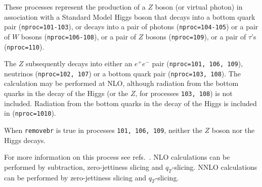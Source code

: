 \label{subsec:zh}

These processes represent the production of a $Z$ boson (or virtual photon)
in association with a Standard Model Higgs boson that
decays into a bottom quark pair ({\tt nproc=101-103}),
or decays into a pair of photons ({\tt nproc=104-105})
or a pair of $W$ bosons ({\tt nproc=106-108}),
or a pair of $Z$ bosons ({\tt nproc=109}),
or a pair of $\tau$'s ({\tt nproc=110}).

The $Z$ subsequently decays into
either an $e^+ e^-$ pair ({\tt nproc=101, 106, 109}), neutrinos ({\tt nproc=102, 107})
or a bottom quark pair ({\tt nproc=103, 108}).
The calculation may be performed at NLO, although radiation from the
bottom quarks in the decay of the Higgs (or the $Z$, for processes
{\tt 103, 108}) is not included.
Radiation from the bottom quarks in the decay of the Higgs is included in ({\tt nproc=1010}).

When {\tt removebr} is true in processes {\tt 101, 106, 109}, neither the $Z$ boson
nor the Higgs decays.

For more information on this
process see refs.~\cite{Campbell:2016jau,Boughezal:2016wmq,Campbell:2022gdq}.
NLO calculations can be performed by subtraction, zero-jettiness
slicing and $q_T$-slicing.  NNLO calculations can be performed by
zero-jettiness slicing and $q_T$-slicing.  
